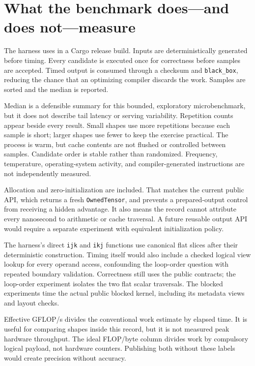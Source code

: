 \section{What the benchmark does---and does
not---measure}\label{what-the-benchmark-doesand-does-notmeasure}

The  harness uses \texttt{} in a
Cargo release build. Inputs are deterministically generated before
timing. Every candidate is executed once for correctness before samples
are accepted. Timed output is consumed through a checksum and
\texttt{black\_box}, reducing the chance that an optimizing compiler
discards the work. Samples are sorted and the median is reported.

Median is a defensible summary for this bounded, exploratory
microbenchmark, but it does not describe tail latency or serving
variability. Repetition counts appear beside every result. Small shapes
use more repetitions because each sample is short; larger shapes use
fewer to keep the exercise practical. The process is warm, but cache
contents are not flushed or controlled between samples. Candidate order
is stable rather than randomized. Frequency, temperature,
operating-system activity, and compiler-generated instructions are not
independently measured.

Allocation and zero-initialization are included. That matches the
current public API, which returns a fresh \texttt{OwnedTensor}, and
prevents a prepared-output control from receiving a hidden advantage. It
also means the record cannot attribute every nanosecond to arithmetic or
cache traversal. A future reusable output API would require a separate
experiment with equivalent initialization policy.

The harness's direct \texttt{ijk} and \texttt{ikj} functions use
canonical flat slices after their deterministic construction. Timing
\texttt{} itself would also include a
checked logical view lookup for every operand access, confounding the
loop-order question with repeated boundary validation. Correctness still
uses the public contracts; the loop-order experiment isolates the two
flat scalar traversals. The blocked experiments time the actual public
blocked kernel, including its metadata views and layout checks.

Effective GFLOP/s divides the conventional work estimate by elapsed
time. It is useful for comparing shapes inside this record, but it is
not measured peak hardware throughput. The ideal FLOP/byte column
divides work by compulsory logical payload, not hardware counters.
Publishing both without these labels would create precision without
accuracy.

